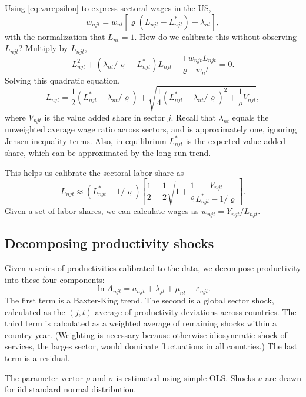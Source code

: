 \documentclass[12pt]{article}
\begin{document}
Using \eqref{eq:varepsilon} to express sectoral wages in the US,
\[
w_{njt} = w_{nt}
\left[
 {\varrho(L_{njt}-L_{njt}^*)}
+\lambda_{nt}
\right],
\]
with the normalization that $L_{nt}=1$.
How do we calibrate this without observing $L_{njt}$? Multiply by $L_{njt}$,
\[
L_{njt}^2 + (\lambda_{nt}/\varrho-L_{njt}^*) L_{njt} - \frac1\varrho
\frac{w_{njt}L_{njt}} {w_nt} = 0.
\]
Solving this quadratic equation,
\[
L_{njt} = \frac12 (L_{njt}^* - \lambda_{nt}/\varrho)
+ \sqrt{\frac14 (L_{njt}^* - \lambda_{nt}/\varrho)^2 + \frac1\varrho V_{njt}},
\]
where $V_{njt}$ is the value added share in sector $j$. Recall that $\lambda_{nt}$ equals the unweighted average wage ratio across sectors, and is approximately one, ignoring Jensen inequality terms. Also, in equilibrium $L_{njt}^*$ is the expected value added share, which can be approximated by the long-run trend.

This helps us calibrate the sectoral labor share as
\[
L_{njt} \approx (L_{njt}^* - 1/\varrho) \left[
\frac12
+\frac12 \sqrt{1 + \frac1\varrho \frac{V_{njt}}{L_{njt}^* - 1/\varrho}}
\right].
\]
Given a set of labor shares, we can calculate wages as $w_{njt} = Y_{njt}/L_{njt}$.

\subsection{Decomposing productivity shocks}
Given a series of productivities calibrated to the data, we decompose productivity into these four components:
\begin{equation}
	\ln A_{njt} = a_{njt}+\lambda_{jt} + \mu_{nt} +  \varepsilon_{njt}.
\end{equation}
The first term is a Baxter-King trend. The second is a global sector shock, calculated as the $(j,t)$ average of productivity deviations across countries. The third term is calculated as a weighted average of remaining shocks within a country-year. (Weighting is necessary because otherwise idiosyncratic shock of services, the larges sector, would dominate fluctuations in all countries.) The last term is a residual.

The parameter vector $\rho$ and $\sigma$ is estimated using simple OLS. Shocks $u$ are drawn for iid standard normal distribution.
\end{document}
